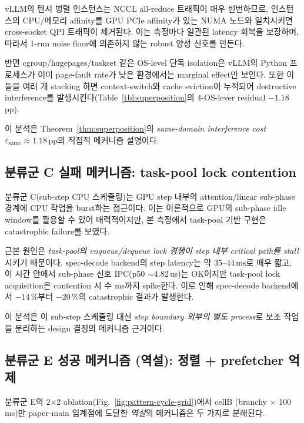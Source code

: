 vLLM의 텐서 병렬 인스턴스는 NCCL all-reduce 트래픽이 매우 빈번하므로, 인스턴스의 CPU/메모리 affinity를 GPU PCIe affinity가 있는 NUMA 노드와 일치시키면 cross-socket QPI 트래픽이 제거된다.
이는 측정마다 일관된 latency 회복을 보장하며, 따라서 1-run noise floor에 의존하지 않는 robust 양성 신호를 만든다.

반면 cgroup/hugepages/taskset 같은 OS-level 단독 isolation은 vLLM의 Python 프로세스가 이미 page-fault rate가 낮은 환경에서는 marginal effect만 보인다.
또한 이들을 여러 개 stacking 하면 context-switch와 cache eviction이 누적되어 destructive interference를 발생시킨다(Table~\ref{tbl:superposition}의 4-OS-lever residual $-1.18$\,pp).

이 분석은 Theorem~\ref{thm:superposition}의 \emph{same-domain interference cost} $\varepsilon_{\text{same}} \approx 1.18$\,pp의 직접적 메커니즘 설명이다.

\subsection{분류군 C 실패 메커니즘: task-pool lock contention}

분류군 C(sub-step CPU 스케줄링)는 GPU step 내부의 attention/linear sub-phase 경계에 CPU 작업을 burst하는 접근이다.
이는 이론적으로 GPU의 sub-phase idle window를 활용할 수 있어 매력적이지만, 본 측정에서 task-pool 기반 구현은 catastrophic failure를 보였다.

근본 원인은 \emph{task-pool의 enqueue/dequeue lock 경쟁이 step 내부 critical path를 stall} 시키기 때문이다.
spec-decode backend의 step latency는 약 35--44\,ms로 매우 짧고, 이 시간 안에서 sub-phase 신호 IPC(p50 $\sim$4.82\,us)는 OK이지만 task-pool lock acquisition은 contention 시 수 ms까지 spike한다.
이로 인해 spec-decode backend에서 $-14$\,\%부터 $-20$\,\%의 catastrophic 결과가 발생한다.

이 분석은 \algname 이 sub-step 스케줄링 대신 \emph{step boundary 외부의 별도 process}로 보조 작업을 분리하는 design 결정의 메커니즘 근거이다.

\subsection{분류군 E 성공 메커니즘 (역설): 정렬 + prefetcher 억제}



분류군 E의 2$\times$2 ablation(Fig.~\ref{fig:pattern-cycle-grid})에서 cellB (branchy $\times$ 100\,ms)만 paper-main 임계점에 도달한 \emph{역설}의 메커니즘은 두 가지로 분해된다.

